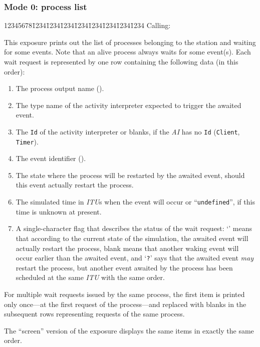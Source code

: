 \subsubsection*{Mode 0: process list}

{\tt\begin{tabbing}
12345678\=1234\=1234\=1234\=1234\=1234\=1234\=1234\=1234\kill
{\rm Calling:}
\end{tabbing}}

This exposure prints out the list of processes belonging to the station
and waiting for some events.
Note that an alive process always waits for some event(s).
Each wait request is represented by one row containing the following data
(in this order):

\begin{enumerate}
\item
The process output name ().
\item
The type name of the activity interpreter expected to trigger the awaited
event.
\item
The {\tt Id} of the activity interpreter or blanks, if the {\em AI\/} has no
{\tt Id} ({\tt Client}, {\tt Timer}).
\item
The event identifier ().
\item
The state where the process will be restarted by the awaited event, should this
event actually restart the process.
\item
The simulated time in {\em ITU\/}s when the event will occur or
``{\tt undefined}'', if this time is unknown at present.
\item
A single-character flag that describes the status of the wait request:
`{\tt *}' means that according to the current state of the simulation,
the awaited event will actually restart the process,
blank means that another
waking event will occur earlier than the awaited event, and `{\tt ?}' says that
the awaited event {\em may\/} restart the process, but another event awaited
by the process has been scheduled at the same {\em ITU} with the same order.
\end{enumerate}

For multiple wait requests issued by the same process, the first
item is printed only once---at the first request of the process---and
replaced with blanks in the subsequent rows representing
requests of the same process.

The ``screen'' version of the exposure displays the same items in exactly
the same order.


